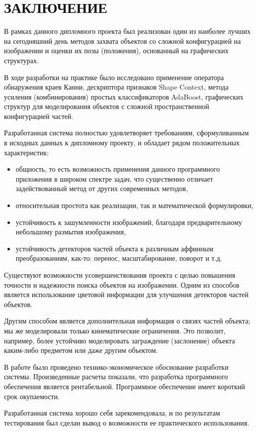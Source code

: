 \section*{ЗАКЛЮЧЕНИЕ}
В рамках данного дипломного проекта был реализован один из наиболее лучших на сегодняшний день методов захвата объектов со сложной конфигурацией на изображении и оценки их позы (положения), основанный на графических структурах.

В ходе разработки на практике было исследовано применение оператора обнаружения краев Канни, дескриптора признаков Shape Context, метода усиления (комбинирования) простых классификаторов AdaBoost, графических структур для моделирования объектов с сложной пространственной конфигурацией частей.

Разработанная система полностью удовлетворяет требованиям, сформуливанным в исходных данных к дипломному проекту, и обладает рядом положительных характеристик:
\begin{itemize}
  \item общность, то есть возможность применения данного программного приложения в широком спектре задач, что существенно отличает задействованный метод от других современных методов,
  \item относительная простота как реализации, так и математической формулировки,
  \item устойчивость к зашумленности изображений, благодаря предварительному небольшому размытия изображения,
  \item устойчивость детекторов частей объекта к различным аффинным преобразованиям, как-то: перенос, масштабирование, поворот и т.д.
\end{itemize}

Существуют возможности усовершенствования проекта с целью повышения точности и надежности поиска объектов на изображении. Одним из способов является использование цветовой информации для улучшения детекторов частей объектов.

Другим способом является дополнительная информация о связях частей объекта; мы же моделировали только кинематические ограничения. Это позволит, например, более устойчиво моделировать заграждение (заслонение) объекта каким-либо предметом или даже другим объектом.

В работе было проведено технико-экономическое обоснование разработки системы. Произведенные расчеты показали, что разработка программного обеспечения является рентабельной. Программное обеспечение имеет короткий срок окупаемости.

Разработанная система хорошо себя зарекомендовала, и по результатам тестирования был сделан вывод о возможности ее практического использования.

\newpage
